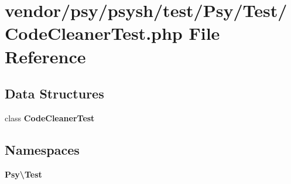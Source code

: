 \section{vendor/psy/psysh/test/\+Psy/\+Test/\+Code\+Cleaner\+Test.php File Reference}
\label{_code_cleaner_test_8php}
\subsection*{Data Structures}
\begin{DoxyCompactItemize}
\item 
class {\bf Code\+Cleaner\+Test}
\end{DoxyCompactItemize}
\subsection*{Namespaces}
\begin{DoxyCompactItemize}
\item 
 {\bf Psy\textbackslash{}\+Test}
\end{DoxyCompactItemize}
